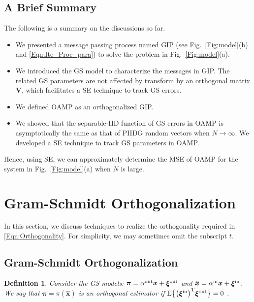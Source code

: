 \documentclass[journal]{IEEEtran}
\renewcommand{\bf}{\bm}
\newtheorem{definition}[theorem]{Definition}
\begin{document}
\subsection{A Brief Summary} 
The following is a summary on the discussions so far. 
\begin{itemize}
    \item We presented a message passing process named GIP (see Fig.~\ref{Fig:model}(b) and \eqref{Eqn:Ite_Proc_para}) to solve the problem in Fig.~\ref{Fig:model}(a). 
    \item We introduced the GS model to characterize the messages in GIP. The related GS parameters are not affected by transform by an orthogonal matrix $\bf{V}$, which facilitates a SE technique to track GS errors.
    \item We defined OAMP as an orthogonalized GIP.  
    \item We showed that the separable-IID function of GS errors in OAMP is asymptotically the same as that of PIIDG random vectors when $N \to \infty$. We developed a SE technique to track GS parameters in OAMP. 
\end{itemize} 
Hence, using SE, we can approximately determine the MSE  of OAMP for the system in Fig.~\ref{Fig:model}(a) when $N$ is large.

 



\section{Gram-Schmidt Orthogonalization}\label{Sec:GS_orth}
In this section, we discuss techniques to realize the orthogonality required in \eqref{Eqn:Orthogonality}. For simplicity, we may sometimes omit the subscript $t$.

\subsection{Gram-Schmidt Orthogonalization}\label{Sec:Bussgang_Orho}
\begin{definition}
 Consider the GS models:  $\bf{\pi}=\alpha^{\rm out}\bf{x}+\bf{\xi}^{\rm out}$ and $\hat{\bf{x}}=\alpha^{\rm in}\bf{x}+\bf{\xi}^{\rm in}$. We say that $\bf{\pi}=\pi(\hat{\bf{x}})$ is an orthogonal estimator if ${\rm E}\big\{\big(\bf{\xi}^{\rm in}\big)^{\rm T} \bf{\xi}^{\rm out}\big\}=0$ \cite{Schmidt1908}. 
\end{definition}
\end{document}
